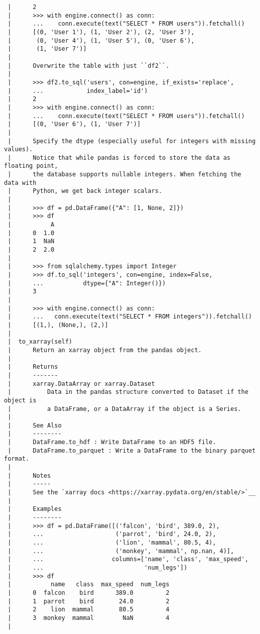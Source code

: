 \documentclass[
  letterpaper,
  DIV=11,
  numbers=noendperiod]{scrreprt}
\begin{document}
\begin{verbatim}
 |      2
 |      >>> with engine.connect() as conn:
 |      ...    conn.execute(text("SELECT * FROM users")).fetchall()
 |      [(0, 'User 1'), (1, 'User 2'), (2, 'User 3'),
 |       (0, 'User 4'), (1, 'User 5'), (0, 'User 6'),
 |       (1, 'User 7')]
 |      
 |      Overwrite the table with just ``df2``.
 |      
 |      >>> df2.to_sql('users', con=engine, if_exists='replace',
 |      ...            index_label='id')
 |      2
 |      >>> with engine.connect() as conn:
 |      ...    conn.execute(text("SELECT * FROM users")).fetchall()
 |      [(0, 'User 6'), (1, 'User 7')]
 |      
 |      Specify the dtype (especially useful for integers with missing values).
 |      Notice that while pandas is forced to store the data as floating point,
 |      the database supports nullable integers. When fetching the data with
 |      Python, we get back integer scalars.
 |      
 |      >>> df = pd.DataFrame({"A": [1, None, 2]})
 |      >>> df
 |           A
 |      0  1.0
 |      1  NaN
 |      2  2.0
 |      
 |      >>> from sqlalchemy.types import Integer
 |      >>> df.to_sql('integers', con=engine, index=False,
 |      ...           dtype={"A": Integer()})
 |      3
 |      
 |      >>> with engine.connect() as conn:
 |      ...   conn.execute(text("SELECT * FROM integers")).fetchall()
 |      [(1,), (None,), (2,)]
 |  
 |  to_xarray(self)
 |      Return an xarray object from the pandas object.
 |      
 |      Returns
 |      -------
 |      xarray.DataArray or xarray.Dataset
 |          Data in the pandas structure converted to Dataset if the object is
 |          a DataFrame, or a DataArray if the object is a Series.
 |      
 |      See Also
 |      --------
 |      DataFrame.to_hdf : Write DataFrame to an HDF5 file.
 |      DataFrame.to_parquet : Write a DataFrame to the binary parquet format.
 |      
 |      Notes
 |      -----
 |      See the `xarray docs <https://xarray.pydata.org/en/stable/>`__
 |      
 |      Examples
 |      --------
 |      >>> df = pd.DataFrame([('falcon', 'bird', 389.0, 2),
 |      ...                    ('parrot', 'bird', 24.0, 2),
 |      ...                    ('lion', 'mammal', 80.5, 4),
 |      ...                    ('monkey', 'mammal', np.nan, 4)],
 |      ...                   columns=['name', 'class', 'max_speed',
 |      ...                            'num_legs'])
 |      >>> df
 |           name   class  max_speed  num_legs
 |      0  falcon    bird      389.0         2
 |      1  parrot    bird       24.0         2
 |      2    lion  mammal       80.5         4
 |      3  monkey  mammal        NaN         4
 |      

\end{verbatim}
\end{document}
